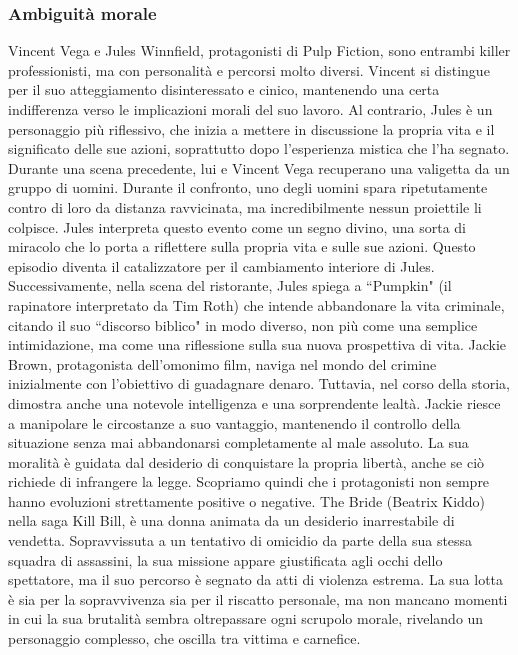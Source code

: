 \documentclass[12pt]{article} %
\begin{document}
\begin{flushleft}
    \subsubsection*{Ambiguità morale}
    Vincent Vega e Jules Winnfield, protagonisti di Pulp Fiction, sono entrambi killer professionisti, ma con personalità e percorsi molto diversi. Vincent si distingue per il suo atteggiamento disinteressato e cinico, mantenendo una certa indifferenza verso le implicazioni morali del suo lavoro. Al contrario, Jules è un personaggio più riflessivo, che inizia a mettere in discussione la propria vita e il significato delle sue azioni, soprattutto dopo l’esperienza mistica che l'ha segnato. Durante una scena precedente, lui e Vincent Vega recuperano una valigetta da un gruppo di uomini. Durante il confronto, uno degli uomini spara ripetutamente contro di loro da distanza ravvicinata, ma incredibilmente nessun proiettile li colpisce. Jules interpreta questo evento come un segno divino, una sorta di miracolo che lo porta a riflettere sulla propria vita e sulle sue azioni. Questo episodio diventa il catalizzatore per il cambiamento interiore di Jules. Successivamente, nella scena del ristorante, Jules spiega a ``Pumpkin" (il rapinatore interpretato da Tim Roth) che intende abbandonare la vita criminale, citando il suo ``discorso biblico" in modo diverso, non più come una semplice intimidazione, ma come una riflessione sulla sua nuova prospettiva di vita.
    Jackie Brown, protagonista dell'omonimo film, naviga nel mondo del crimine inizialmente con l'obiettivo di guadagnare denaro. Tuttavia, nel corso della storia, dimostra anche una notevole intelligenza e una sorprendente lealtà. Jackie riesce a manipolare le circostanze a suo vantaggio, mantenendo il controllo della situazione senza mai abbandonarsi completamente al male assoluto. La sua moralità è guidata dal desiderio di conquistare la propria libertà, anche se ciò richiede di infrangere la legge.
    Scopriamo quindi che i protagonisti non sempre hanno evoluzioni strettamente positive o negative. The Bride (Beatrix Kiddo) nella saga Kill Bill, è una donna animata da un desiderio inarrestabile di vendetta. Sopravvissuta a un tentativo di omicidio da parte della sua stessa squadra di assassini, la sua missione appare giustificata agli occhi dello spettatore, ma il suo percorso è segnato da atti di violenza estrema. La sua lotta è sia per la sopravvivenza sia per il riscatto personale, ma non mancano momenti in cui la sua brutalità sembra oltrepassare ogni scrupolo morale, rivelando un personaggio complesso, che oscilla tra vittima e carnefice.

\end{flushleft}
\end{document}
